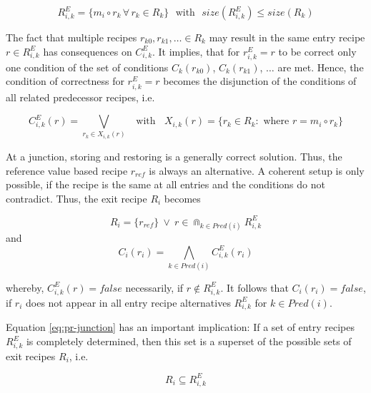 \documentclass[12pt,a4paper]{scrartcl}
\begin{document}
\begin{equation} \label{eq:composition-recipe-alternatives}
    R^E_{i,k} = \{ m_i \circ r_k \,\forall\,r_k\in R_k \} 
    \,\,\mbox{ with }\,\,
    size(R^E_{i,k}) \le size(R_k) 
\end{equation}

The fact that multiple recipes $r_{k0},r_{k1},\ldots \in R_k$ may result in the
same entry recipe $r\in R^E_{i,k}$ has consequences on $C^E_{i,k}$. It implies,
that for $r^E_{i,k}=r$ to be correct only one condition of the set of conditions $C_k(r_{k0})$, 
$C_k(r_{k1})$, $\ldots$ are met. Hence, the condition of correctness for
$r^E_{i,k}=r$ becomes the disjunction of the conditions of all related
predecessor recipes, i.e. 

\begin{equation} \label{eq:composition-condition}
    C^E_{i,k}(r) = \bigvee_{r_k\in X_{i,k}(r)} \
                   \,\, \mbox{ with } \,\,     \
                   X_{i,k}(r) = \{ r_k\in R_k: \mbox{ where } r = m_i\circ r_k \}
\end{equation}

At a junction, storing and restoring is a generally correct solution. Thus, the
reference value based recipe $r_{ref}$ is always an alternative. A coherent
setup is only possible, if the recipe is the same at all entries and the
conditions do not contradict. Thus, the exit recipe $R_i$ becomes

\begin{equation} \label{eq:pr-junction}
    R_i = \{ r_{ref} \} \
             \vee       \
          r\in\Cap_{k\in Pred(i)} R^E_{i,k} 
\end{equation}
and
\begin{equation} \label{eq:c-junction}
    C_i(r_i) = \bigwedge_{k\in Pred(i)} C^E_{i,k}(r_i)
\end{equation}

whereby, $C^E_{i,k}(r)=false$ necessarily, if $r\notin R^E_{i,k}$. It follows
that $C_i(r_i)=false$, if $r_i$ does not appear in all entry recipe alternatives
$R^E_{i,k}$ for $k\in Pred(i)$.

Equation \ref{eq:pr-junction} has an important implication: If a set of entry
recipes $R^E_{i,k}$ is completely determined, then this set is a superset of
the possible sets of exit recipes $R_i$, i.e.

\begin{equation} \label{eq:pr-subset-junction}
    R_i \subseteq R^E_{i,k} 
\end{equation}
\end{document}

